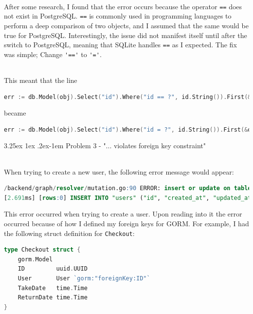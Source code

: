 \documentclass[11pt,a4paper]{article}
\makeatletter
\renewcommand\subparagraph{%
\@startsection{subparagraph}{5}{0pt}%
{3.25ex \@plus 1ex \@minus .2ex}{-1em}%
{\normalfont\normalsize\bfseries}}
\makeatother
\begin{document}
\noindent \\ After some research, I found that the error occurs because the operator \lstinline{==} does not exist in PostgreSQL. \lstinline{==} is commonly used in programming languages to perform a deep comparison of two objects, and I assumed that the same would be true for PostgreSQL.
Interestingly, the issue did not manifest itself until after the switch to PostgreSQL, meaning that SQLite handles \lstinline{==} as I expected.
The fix was simple; Change \lstinline{'=='} to \lstinline{'='}.

\noindent \\ This meant that the line

\begin{lstlisting}[language=Go]
    err := db.Model(obj).Select("id").Where("id == ?", id.String()).First(&obj).Error
\end{lstlisting}

\noindent became

\begin{lstlisting}[language=Go]
    err := db.Model(obj).Select("id").Where("id = ?", id.String()).First(&obj).Error
\end{lstlisting}

\subparagraph{Problem 3 - "... violates foreign key constraint"}

\noindent \\ When trying to create a new user, the following error message would appear:

\begin{lstlisting}[language=SQL]
/backend/graph/resolver/mutation.go:90 ERROR: insert or update on table "users" violates foreign key constraint "fk_checkouts_user" (SQLSTATE 23503)
[2.691ms] [rows:0] INSERT INTO "users" ("id", "created_at", "updated_at", "deleted_at", "first_name", "last_name", "email", "hash") VALUES [..]
\end{lstlisting}

\noindent This error occurred when trying to create a user. Upon reading into it the error occurred because of how I defined my foreign keys for GORM. For example, I had the following struct definition for \lstinline{Checkout}:

\begin{lstlisting}[language=Go]
type Checkout struct {
	gorm.Model
	ID         uuid.UUID
	User       User `gorm:"foreignKey:ID"`
	TakeDate   time.Time
	ReturnDate time.Time
}
\end{lstlisting}
\end{document}
